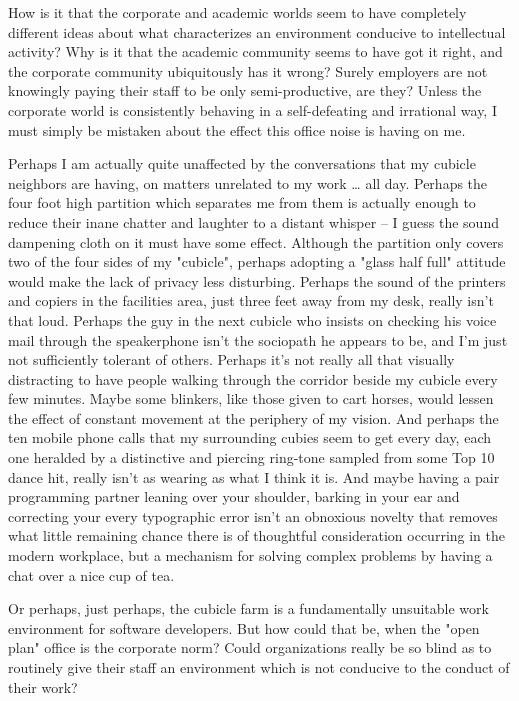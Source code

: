 \documentclass{article}
\begin{document}
\begin{enumerate}
How is it that the corporate and academic worlds seem to have completely
different ideas about what characterizes an environment conducive to
intellectual activity? Why is it that the academic community seems to
have got it right, and the corporate community ubiquitously has it
wrong? Surely employers are not knowingly paying their staff to be only
semi-productive, are they? Unless the corporate world is consistently
behaving in a self-defeating and irrational way, I must simply be
mistaken about the effect this office noise is having on me.

Perhaps I am actually quite unaffected by the conversations that my
cubicle neighbors are having, on matters unrelated to my work \ldots{} all
day. Perhaps the four foot high partition which separates me from them
is actually enough to reduce their inane chatter and laughter to a
distant whisper -- I guess the sound dampening cloth on it must have
some effect. Although the partition only covers two of the four sides of
my "cubicle", perhaps adopting a "glass half full" attitude would make
the lack of privacy less disturbing. Perhaps the sound of the printers
and copiers in the facilities area, just three feet away from my desk,
really isn't that loud. Perhaps the guy in the next cubicle who insists
on checking his voice mail through the speakerphone isn't the sociopath
he appears to be, and I'm just not sufficiently tolerant of others.
Perhaps it's not really all that visually distracting to have people
walking through the corridor beside my cubicle every few minutes. Maybe
some blinkers, like those given to cart horses, would lessen the effect
of constant movement at the periphery of my vision. And perhaps the ten
mobile phone calls that my surrounding cubies seem to get every day,
each one heralded by a distinctive and piercing ring-tone sampled from
some Top 10 dance hit, really isn't as wearing as what I think it is.
And maybe having a pair programming partner leaning over your shoulder,
barking in your ear and correcting your every typographic error isn't an
obnoxious novelty that removes what little remaining chance there is of
thoughtful consideration occurring in the modern workplace, but a
mechanism for solving complex problems by having a chat over a nice cup
of tea.

Or perhaps, just perhaps, the cubicle farm is a fundamentally unsuitable
work environment for software developers. But how could that be, when
the "open plan" office is the corporate norm? Could organizations really
be so blind as to routinely give their staff an environment which is not
conducive to the conduct of their work?


\end{enumerate}
\end{document}
